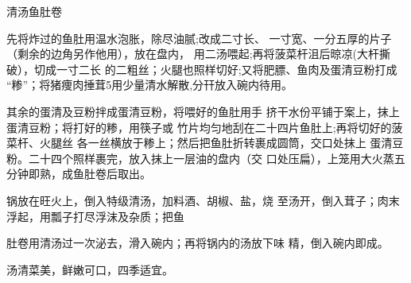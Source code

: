 \begin{recipe}{清汤鱼肚卷}

\ingredients



\cooking

\step 先将炸过的鱼肚用温水泡胀，除尽油腻;改成二寸长、 一寸宽、一分五厚的片子（剩余的边角另作他用），放在盘内， 用二汤喂起;再将菠菜杆沮后晾凉(大杆撕破），切成一寸二长 的二粗丝；火腿也照样切好;又将肥膘、鱼肉及蛋清豆粉打成 “糁”；将猪痩肉捶茸5用少量清水解散,分幵放入碗内待用。

\step 其余的蛋清及豆粉拌成蛋清豆粉，将喂好的鱼肚用手 挤干水份平铺于案上，抹上蛋清豆粉；将打好的糁，用筷子或 竹片均匀地刮在二十四片鱼肚上;再将切好的菠菜杆、火腿丝 各一丝横放于糁上；然后把鱼肚折转裹成圆筒，交口处抹上 蛋清豆粉。二十四个照样裹完，放入抹上一层油的盘内（交 口处压扁），上笼用大火蒸五分钟即熟，成鱼肚卷后取出。

\step 锅放在旺火上，倒入特级清汤，加料酒、胡椒、盐，烧 至汤开，倒入茸子；肉末浮起，用瓢子打尽浮沫及杂质；把鱼

肚卷用清汤过一次泌去，滑入碗内；再将锅内的汤放下味 精，倒入碗内即成。

\notes

汤清菜美，鲜嫩可口，四季适宜。

\end{recipe}

